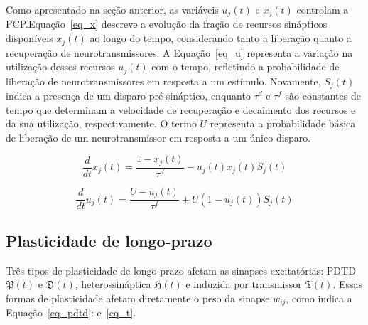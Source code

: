 Como apresentado na seção anterior, as variáveis $u_j(t)$ e $x_j(t)$ controlam a PCP.\@A Equação~\ref{eq_x} descreve a evolução da
fração de recursos sinápticos disponíveis $x_j(t)$ ao longo do tempo, considerando tanto a liberação quanto a recuperação de
neurotransmissores. A Equação~\ref{eq_u} representa a variação na utilização desses recursos $u_j(t)$ com o tempo, refletindo a
probabilidade de liberação de neurotransmissores em resposta a um estímulo. Novamente, $S_j(t)$ indica a presença de um disparo
pré-sináptico, enquanto $\tau^d$ e $\tau^f$ são constantes de tempo que determinam a velocidade de recuperação e decaimento dos
recursos e da sua utilização, respectivamente. O termo $U$ representa a probabilidade básica de liberação de um neurotransmissor em
resposta a um único disparo.

\begin{equation}
\label{eq_x}
\frac{d}{dt} x_j(t) = \frac{1 - x_j(t)}{\tau^d} - u_j(t) x_j(t) S_j(t)
\end{equation}

\begin{equation}
\label{eq_u}
\frac{d}{dt}u_j(t) = \frac{U - u_j(t)}{\tau^f} + U(1 - u_j(t)) S_j(t)
\end{equation}

\subsection{Plasticidade de longo-prazo}

Três tipos de plasticidade de longo-prazo afetam as sinapses excitatórias: PDTD $\mathfrak{P}(t)$ e  $\mathfrak{D}(t)$,
heterossináptica $\mathfrak{H}(t)$ e induzida por transmissor $\mathfrak{T}(t)$. Essas formas de plasticidade afetam diretamente o
peso da sinapse $w_{ij}$, como indica a Equação~\ref{eq_pdtd}:
e~\ref{eq_t}.

